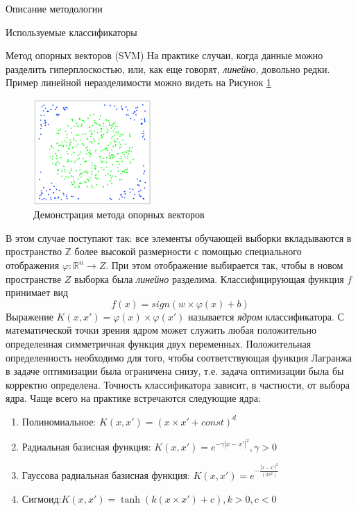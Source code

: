 \begin{section}{Описание методологии}
\begin{subsection}{Используемые классификаторы}
\begin{subsubsection}{Метод опорных векторов (SVM)}
На практике случаи, когда данные можно разделить гиперплоскостью, или, как еще говорят, \textit{линейно}, довольно редки. Пример линейной неразделимости можно видеть на Рисунок \ref{pic:SVM4}

\begin{figure}[ht!]
\centering
\includegraphics[width=0.4\textwidth]{pics/SVM4}
\caption{Демонстрация метода опорных векторов}
\label{pic:SVM4}
\end{figure}

В этом случае поступают так: все элементы обучающей выборки вкладываются в пространство $\mathbb{Z}$ более высокой размерности с помощью специального отображения $\varphi:\mathbb{R}^n \rightarrow Z$. При этом отображение  выбирается так, чтобы в новом пространстве $Z$ выборка была \textit{линейно} разделима.
Классифицирующая функция $f$ принимает вид
\begin{equation}
  f(x)=sign (w \times \varphi(x)+b)
\end{equation}
Выражение $K(x,x')= \varphi(x)\times \varphi(x')$ называется \textit{ядром} классификатора. С математической точки зрения ядром может служить любая положительно определенная симметричная функция двух переменных. Положительная определенность необходимо для того, чтобы соответствующая функция Лагранжа в задаче оптимизации была ограничена снизу, т.е. задача оптимизации была бы корректно определена. Точность классификатора зависит, в частности, от выбора ядра.
Чаще всего на практике встречаются следующие ядра:
\begin{enumerate}
  \item Полиномиальное: $K(x,x')= (x \times x'+ const)^d$
  \item Радиальная базисная функция: $K(x,x')= e^{-\gamma|x-x'|^2},\gamma > 0$
  \item Гауссова радиальная базисная функция: $K(x,x')= e^{-\frac{|x-x'|^2}{(2\sigma^2)}}$
  \item Сигмоид:$K(x,x') = \tanh⁡(k(x\times x')+c), k > 0, c < 0$
\end{enumerate}



\end{subsubsection}
\end{subsection}
\end{section}
